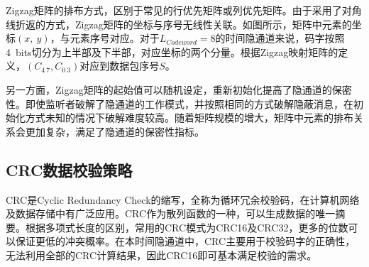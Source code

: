
Zigzag矩阵的排布方式，区别于常见的行优先矩阵或列优先矩阵。由于采用了对角线折返的方式，Zigzag矩阵的坐标与序号无线性关联。如图所示，矩阵中元素的坐标$(x,\ y)$，与元素序号对应。对于$L_{Codeword}=8$的时间隐通道来说，码字按照{4\ bits}切分为上半部及下半部，对应坐标的两个分量。根据Zigzag映射矩阵的定义，$(C_{4~7},C_{0~3})$对应到数据包序号$S$。

另一方面，Zigzag矩阵的起始值可以随机设定，重新初始化提高了隐通道的保密性。即使监听者破解了隐通道的工作模式，并按照相同的方式破解隐蔽消息，在初始化方式未知的情况下破解难度较高。随着矩阵规模的增大，矩阵中元素的排布关系会更加复杂，满足了隐通道的保密性指标。

\subsection{CRC数据校验策略}
\label{chap:zigzag:motivation:crc}

CRC是Cyclic Redundancy Check的缩写，全称为循环冗余校验码，在计算机网络及数据存储中有广泛应用。CRC作为散列函数的一种，可以生成数据的唯一摘要。根据多项式长度的区别，常用的CRC模式为CRC16及CRC32，更多的位数可以保证更低的冲突概率。在本时间隐通道中，CRC主要用于校验码字的正确性，无法利用全部的CRC计算结果，因此CRC16即可基本满足校验的需求。


